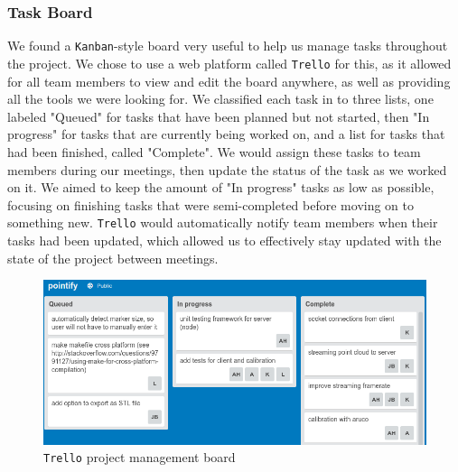 \documentclass{article}
\begin{document}
\subsubsection{Task Board}
We found a \texttt{Kanban}-style board \cite{kanban} very useful to help us manage tasks throughout the project. We chose to use a web platform called \texttt{Trello} \cite{trello} for this, as it allowed for all team members to view and edit the board anywhere, as well as providing all the tools we were looking for. We classified each task in to three lists, one labeled "Queued" for tasks that have been planned but not started, then "In progress" for tasks that are currently being worked on, and a list for tasks that had been finished, called "Complete". We would assign these tasks to team members during our meetings, then update the status of the task as we worked on it. We aimed to keep the amount of "In progress" tasks as low as possible, focusing on finishing tasks that were semi-completed before moving on to something new. \texttt{Trello} \cite{trello} would automatically notify team members when their tasks had been updated, which allowed us to effectively stay updated with the state of the project between meetings. 
\begin{figure}[h]
  \centering
  \includegraphics[scale=0.5]{trello}
  \caption{\texttt{Trello} \cite{trello} project management board}
  \label{fig:trello}
\end{figure}
\\
\end{document}
